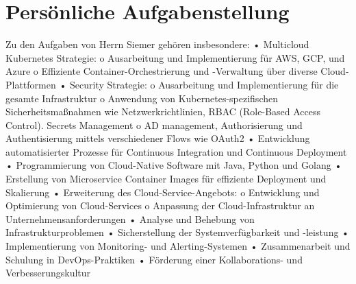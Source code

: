\section{Persönliche Aufgabenstellung}
\label{sec:intro:persoenliche-aufgabenstellung}
Zu den Aufgaben von Herrn Siemer gehören insbesondere:
• Multicloud Kubernetes Strategie:
o Ausarbeitung und Implementierung für AWS, GCP, und Azure
o Effiziente Container-Orchestrierung und -Verwaltung über diverse Cloud-Plattformen
• Security Strategie:
o Ausarbeitung und Implementierung für die gesamte Infrastruktur
o Anwendung von Kubernetes-spezifischen Sicherheitsmaßnahmen wie
Netzwerkrichtlinien, RBAC (Role-Based Access Control). Secrets Management
o AD management, Authorisierung und Authentisierung mittels verschiedener Flows wie
OAuth2
• Entwicklung automatisierter Prozesse für Continuous Integration und Continuous Deployment
• Programmierung von Cloud-Native Software mit Java, Python und Golang
• Erstellung von Microservice Container Images für effiziente Deployment und Skalierung
• Erweiterung des Cloud-Service-Angebots:
o Entwicklung und Optimierung von Cloud-Services
o Anpassung der Cloud-Infrastruktur an Unternehmensanforderungen
• Analyse und Behebung von Infrastrukturproblemen
• Sicherstellung der Systemverfügbarkeit und -leistung
• Implementierung von Monitoring- und Alerting-Systemen
• Zusammenarbeit und Schulung in DevOps-Praktiken
• Förderung einer Kollaborations- und Verbesserungskultur
